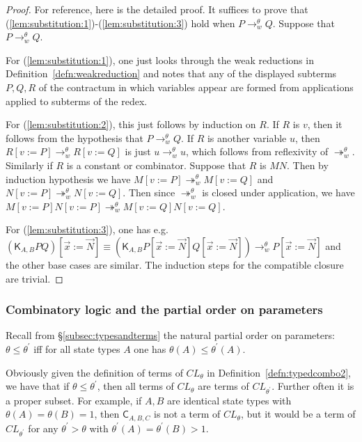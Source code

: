 \documentclass{lmcs} %
\newcommand{\param}{\theta}
\newcommand{\clt}[1]{CL_{#1}}
\newcommand{\cltup}{CL_{\param}}
\newcommand{\reduces}[2]{\rightarrow_{#1}^{#2}}
\newcommand{\transreduces}[2]{\twoheadrightarrow_{#1}^{#2}}
\newcommand{\ctK}[4]{{\mathsf K}_{#1, #2}#3#4}
\newcommand{\ctC}[6]{{\mathsf C}_{#1, #2, #3}#4#5#6}
\begin{document}
\begin{proofdetail}
\begin{proof}
For reference, here is the detailed proof. It suffices to prove that (\ref{lem:substitution:1})-(\ref{lem:substitution:3}) hold when $P \reduces{w}{\param} Q$. Suppose that  $P\reduces{w}{\param} Q$. 

For (\ref{lem:substitution:1}), one just looks through the weak reductions in Definition~\ref{defn:weakreduction} and notes that any of the displayed subterms $P,Q,R$ of the contractum in which variables appear are formed from applications applied to subterms of the redex.  

For (\ref{lem:substitution:2}), this just follows by induction on $R$. If $R$ is $v$, then it follows from the hypothesis that $P\reduces{w}{\param} Q$. If $R$ is another variable $u$, then $R[v:=P] \reduces{w}{\param} R[v:=Q]$ is just $u\reduces{w}{\param} u$, which follows from reflexivity of $\transreduces{w}{\param}$. Similarly if $R$ is a constant or combinator. Suppose that $R$ is $MN$. Then by induction hypothesis we have $M[v:=P] \transreduces{w}{\param} M[v:=Q]$ and $N[v:=P] \transreduces{w}{\param} N[v:=Q]$. Then since $\transreduces{w}{\param}$ is closed under application, we have $M[v:=P]N[v:=P] \transreduces{w}{\param} M[v:=Q] N[v:=Q]$.

For (\ref{lem:substitution:3}), one has e.g.  $(\ctK{A}{B}{P}{Q})[\vec{x}:=\vec{N}] \equiv  (\ctK{A}{B}{P[\vec{x}:=\vec{N}]}{Q[\vec{x}:=\vec{N}]})  \reduces{w}{\param} P[\vec{x}:=\vec{N}]$ and the other base cases are similar. The induction steps for the compatible closure are trivial.
\end{proof}
\end{proofdetail}


\subsubsection{Combinatory logic and the partial order on parameters}\label{subsec:partialorder}

Recall from \S\ref{subsec:typesandterms} the natural partial order on parameters: $\param \leq \param^{\prime}$ iff for all state types $A$ one has $\param(A)\leq \param^{\prime}(A)$. 

Obviously given the definition of terms of $\cltup$ in Definition~\ref{defn:typedcombo2}, we have that if $\param \leq \param^{\prime}$, then all terms of $\cltup$ are terms of $\clt{\param^{\prime}}$. Further often it is a proper subset. For example, if $A,B$ are identical state types with $\param(A)=\param(B)=1$, then $\ctC{A}{B}{C}{}{}{}$ is not a term of $\cltup$, but it would be a term of $\clt{\param^{\prime}}$ for any $\param^{\prime} > \param$ with $\param^{\prime}(A)=\param^{\prime}(B)>1$.
\end{document}
